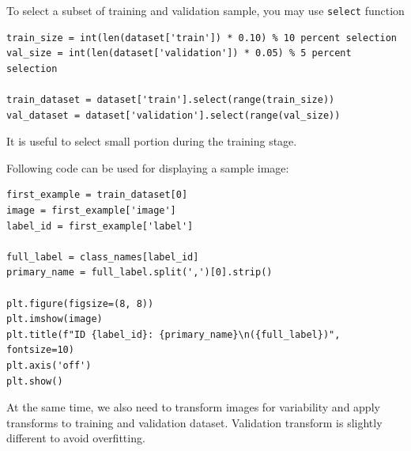 \documentclass[12pt, xcolor=dvipsnames,svgnames,x11names]{article}
\begin{document}
To select a subset of training and validation sample, you may use \texttt{select} function


\begin{verbatim}
train_size = int(len(dataset['train']) * 0.10) % 10 percent selection
val_size = int(len(dataset['validation']) * 0.05) % 5 percent selection

train_dataset = dataset['train'].select(range(train_size))
val_dataset = dataset['validation'].select(range(val_size))

\end{verbatim}
It is useful to select small portion during the training stage.

Following code can be used for displaying a sample image:



\begin{verbatim}
first_example = train_dataset[0]
image = first_example['image']
label_id = first_example['label']

full_label = class_names[label_id]
primary_name = full_label.split(',')[0].strip()

plt.figure(figsize=(8, 8))
plt.imshow(image)
plt.title(f"ID {label_id}: {primary_name}\n({full_label})", fontsize=10)
plt.axis('off')
plt.show()
\end{verbatim}


At the same time, we also need to transform images for variability  and apply transforms to training and validation dataset. Validation transform is slightly different to avoid overfitting.
\end{document}
